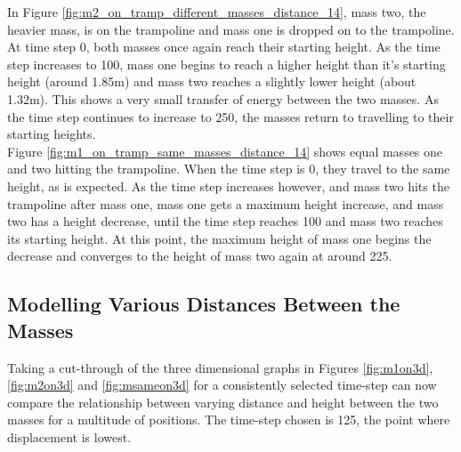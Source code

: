 
\noindent In Figure \ref{fig:m2_on_tramp_different_masses_distance_14}, mass two, the heavier mass, is on the trampoline and mass one is dropped on to the trampoline. At time step 0, both masses once again reach their starting height. As the time step increases to 100, mass one begins to reach a higher height than it's starting height (around 1.85m) and mass two reaches a slightly lower height (about 1.32m). This shows a very small transfer of energy between the two masses. As the time step continues to increase to 250, the masses return to travelling to their starting heights. \\

\noindent Figure \ref{fig:m1_on_tramp_same_masses_distance_14} shows equal masses one and two hitting the trampoline. When the time step is 0, they travel to the same height, as is expected. As the time step increases however, and mass two hits the trampoline after mass one, mass one gets a maximum height increase, and mass two has a height decrease, until the time step reaches 100 and mass two  reaches its starting height. At this point, the maximum height of mass one begins the decrease and converges to the height of mass two again at around 225.




\subsection{Modelling Various Distances Between the Masses}\label{res2}
\noindent Taking a cut-through of the three dimensional graphs in Figures \ref{fig:m1on3d}, \ref{fig:m2on3d} and \ref{fig:msameon3d} for a consistently selected time-step can now compare the relationship between varying distance and height between the two masses for a multitude of positions. The time-step chosen is 125, the point where displacement is lowest. 

